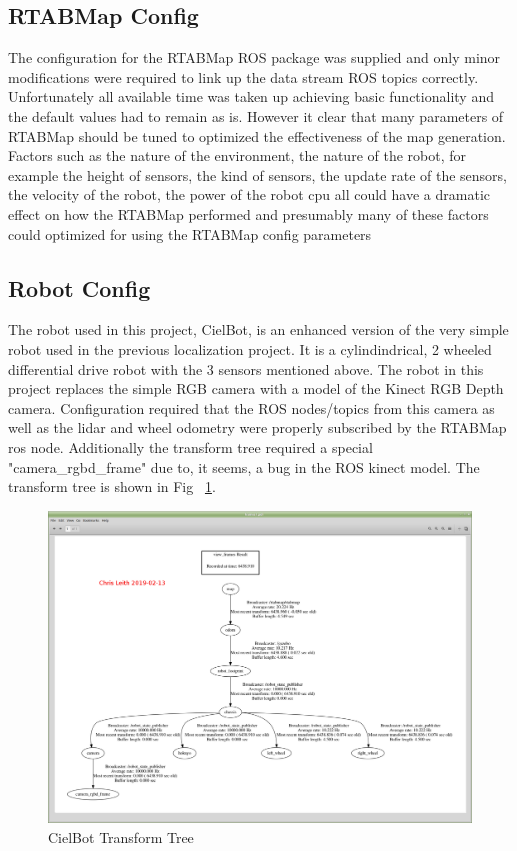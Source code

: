 \documentclass[10pt,journal,compsoc]{IEEEtran}
\begin{document}
\subsection{RTABMap Config}
 The configuration for the RTABMap ROS package was supplied and only minor modifications were required to link up the data stream ROS topics correctly. Unfortunately all available time was taken up achieving basic functionality and the default values had to remain as is. However it clear that many parameters of RTABMap should be tuned to optimized the effectiveness of the map generation. Factors such as the nature of the environment, the nature of the robot, for example the height of sensors, the kind of sensors, the update rate of the sensors, the velocity of the robot, the power of the robot cpu all could have a dramatic effect on how the RTABMap performed and presumably many of these factors could optimized for using the RTABMap config parameters
  
\subsection{Robot Config}
The robot used in this project, CielBot, is an enhanced version of the very simple robot used in the previous localization project. It is a cylindindrical, 2 wheeled differential drive robot with the 3 sensors mentioned above. The robot in this project replaces the simple RGB camera with a model of the Kinect RGB Depth camera. Configuration required that the ROS nodes/topics from this camera as well as the lidar and wheel odometry were properly subscribed by the RTABMap ros node.
Additionally the transform tree required a special "camera\_rgbd\_frame" due to, it seems, a bug in the ROS kinect model. The transform tree is shown in Fig ~\ref{fig:tftree}.

\begin{figure}[h]
      \centering
      \includegraphics[width=\linewidth]{Assets/Frames1_ScreenShot_2019-02-12_16-25-23.png}
      \caption{CielBot Transform Tree}
      \label{fig:tftree}
\end{figure}
\end{document}
